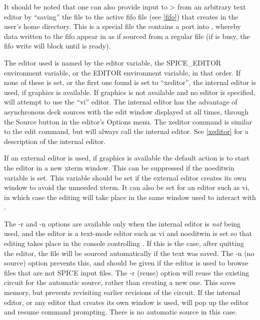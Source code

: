 It should be noted that one can also provide input to {\WRspice}> from
an arbitrary text editor by ``saving'' the file to the active fifo
file (see \ref{fifo}) that {\WRspice} creates in the user's home
directory.  This is a special file the contains a port into
{\WRspice}, whereby data written to the fifo appear in {\WRspice} as
if sourced from a regular file (if {\WRspice} is busy, the fifo write
will block until {\WRspice} is ready).

The editor used is named by the {\et editor} variable, the {\et
SPICE\_EDITOR} environment variable, or the {\et EDITOR} environment
variable, in that order.  If none of these is set, or the first one
found is set to ``{\vt xeditor}'', the internal editor is used, if
graphics is available.  If graphics is not available and no editor is
specified, {\WRspice} will attempt to use the ``{\vt vi}'' editor. 
The internal editor has the advantage of asynchronous deck sources
with the edit window displayed at all times, through the {\cb Source}
button in the editor's {\cb Options} menu.  The {\cb xeditor} command
is similar to the {\cb edit} command, but will always call the
internal editor.  See \ref{xeditor} for a description of the internal
editor.

If an external editor is used, if graphics is available the default
action is to start the editor in a new {\vt xterm} window.  This can
be suppressed if the {\et noeditwin} variable is set.  This variable
should be set if the external editor creates its own window to avoid
the unneeded {\vt xterm}.  It can also be set for an editor such as
{\vt vi}, in which case the editing will take place in the same window
used to interact with {\WRspice}.

The {\vt -r} and {\vt -n} options are available only when the internal
editor is {\it not} being used, and the editor is a text-mode editor
such as {\vt vi} and {\et noeditwin} is set so that editing takes
place in the console controlling {\WRspice}.  If this is the case,
after quitting the editor, the file will be sourced automatically if
the text was saved.  The {\vt -n} (no source) option prevents this,
and should be given if the editor is used to browse files that are not
SPICE input files.  The {\vt -r} (reuse) option will reuse the
existing circuit for the automatic source, rather than creating a new
one.  This saves memory, but prevents revisiting earlier revisions of
the circuit.  If the internal editor, or any editor that creates its
own window is used, {\WRspice} will pop up the editor and resume
command prompting.  There is no automatic source in this case.

